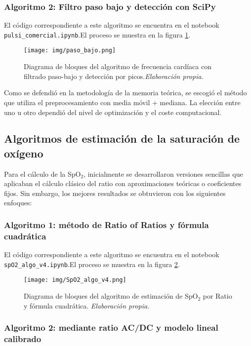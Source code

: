 \subsubsection{Algoritmo 2: Filtro paso bajo y detección con SciPy}

El código correspondiente a este algoritmo se encuentra en el notebook \texttt{pulsi\_comercial.ipynb}.El proceso se muestra en la figura \ref{fig: paso_bajo2}.

\begin{figure}[H]
    \centering
    \texttt{[image: img/paso\_bajo.png]}
    \caption{Diagrama de bloques del algoritmo de frecuencia cardíaca con filtrado paso-bajo y detección por picos.\textit{Elaboración propia.}}
    \label{fig: paso_bajo2}
\end{figure}

Como se defendió en la metodología de la memoria teórica, se escogió el método que utiliza el preprocesamiento con media móvil + mediana. La elección entre uno u otro dependió del nivel de optimización y el coste computacional.

\subsection{Algoritmos de estimación de la saturación de oxígeno}

Para el cálculo de la SpO$_2$, inicialmente se desarrollaron versiones sencillas que aplicaban el cálculo clásico del ratio con aproximaciones teóricas o coeficientes fijos. Sin embargo, los mejores resultados se obtuvieron con los siguientes enfoques:

\subsubsection{Algoritmo 1: método de Ratio of Ratios y fórmula cuadrática }

El código correspondiente a este algoritmo se encuentra en el notebook \texttt{spO2\_algo\_v4.ipynb}.El proceso se muestra en la figura \ref{fig: SpO2_algo_v4}.

\begin{figure}[H]
    \centering
    \texttt{[image: img/SpO2\_algo\_v4.png]}
    \caption{Diagrama de bloques del algoritmo de estimación de SpO$_2$ por Ratio y fórmula cuadrática. \textit{Elaboración propia.}}
    \label{fig: SpO2_algo_v4}
\end{figure}

\subsubsection{Algoritmo 2: mediante ratio AC/DC y modelo lineal calibrado}

